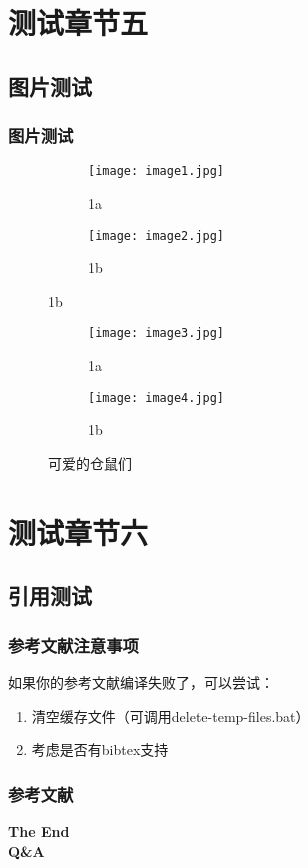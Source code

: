 \documentclass[presentation,aspectratio=1610]{beamer}
\begin{document}
\section{测试章节五}

\subsection{图片测试}

\begin{frame}
\frametitle{图片测试}
	\begin{figure}
		\begin{subfigure}{0.45\textwidth}
		  \centering
		  \texttt{[image: image1.jpg]}
		  \caption{1a}
		  \label{fig:sfig1}
		\end{subfigure}%
		\begin{subfigure}{0.45\textwidth}
		  \centering
		  \texttt{[image: image2.jpg]}
		  \caption{1b}
		  \label{fig:sfig2}
		\end{subfigure}
	\end{figure}
	\begin{figure}
	\begin{subfigure}{0.45\textwidth}
		\centering
		\texttt{[image: image3.jpg]}
		\caption*{1a}
		\label{fig:sfig1}
	\end{subfigure}%
	\begin{subfigure}{0.45\textwidth}
		\centering
		\texttt{[image: image4.jpg]}
		\caption*{1b}
		\label{fig:sfig2}
	\end{subfigure}
	\vspace{-10pt}
	\caption*{可爱的仓鼠们}
	\label{fig:fig}
	\end{figure}
\end{frame}

\section{测试章节六}

\subsection{引用测试}
\begin{frame}
 	\frametitle{参考文献注意事项}
 	如果你的参考文献编译失败了，可以尝试：
 	\begin{enumerate}
 		\item 清空缓存文件（可调用delete-temp-files.bat）
 		\item 考虑是否有bibtex支持
 	\end{enumerate}
\end{frame}
\begin{frame}[t,allowframebreaks]
	\frametitle{参考文献}
	\nocite{*}
	\printbibliography
\end{frame}


\begin{frame}{}
	\centering
		\Huge\bfseries
	\textcolor{whucolor}{The End}\\
	\textcolor{whucolor}{Q\&A}\\
\end{frame}

\end{document}
